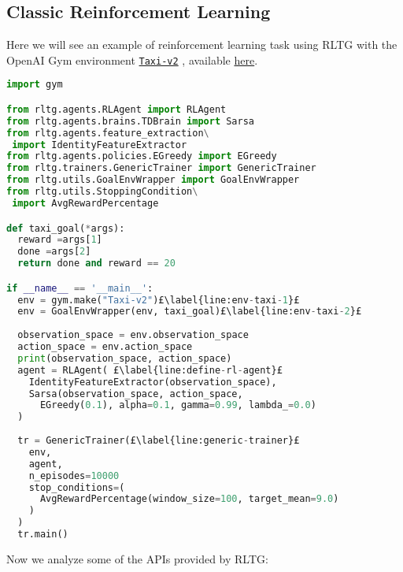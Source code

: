 \subsection{Classic Reinforcement Learning}
Here we will see an example of reinforcement learning task using RLTG with the OpenAI Gym environment \href{https://gym.openai.com/envs/Taxi-v2/}{\texttt{Taxi-v2}} \citep{Dietterich98themaxq}, available \href{https://github.com/MarcoFavorito/rltg/blob/master/examples/taxi.py}{here}.
\begin{lstlisting}[style=Python, language=Python, escapechar=£, label={ex:rltg-classic-rl-example}, caption={Classic Reinforcement Learning using RLTG}]
import gym

from rltg.agents.RLAgent import RLAgent
from rltg.agents.brains.TDBrain import Sarsa
from rltg.agents.feature_extraction\
 import IdentityFeatureExtractor
from rltg.agents.policies.EGreedy import EGreedy
from rltg.trainers.GenericTrainer import GenericTrainer
from rltg.utils.GoalEnvWrapper import GoalEnvWrapper
from rltg.utils.StoppingCondition\
 import AvgRewardPercentage

def taxi_goal(*args):
  reward =args[1]
  done =args[2]
  return done and reward == 20

if __name__ == '__main__':
  env = gym.make("Taxi-v2")£\label{line:env-taxi-1}£ 
  env = GoalEnvWrapper(env, taxi_goal)£\label{line:env-taxi-2}£
  
  observation_space = env.observation_space
  action_space = env.action_space
  print(observation_space, action_space)
  agent = RLAgent( £\label{line:define-rl-agent}£
    IdentityFeatureExtractor(observation_space),
    Sarsa(observation_space, action_space, 
      EGreedy(0.1), alpha=0.1, gamma=0.99, lambda_=0.0)
  )
  
  tr = GenericTrainer(£\label{line:generic-trainer}£
    env, 
    agent, 
    n_episodes=10000
    stop_conditions=(
      AvgRewardPercentage(window_size=100, target_mean=9.0)
    )
  )
  tr.main()
\end{lstlisting}
Now we analyze some of the APIs provided by RLTG:
